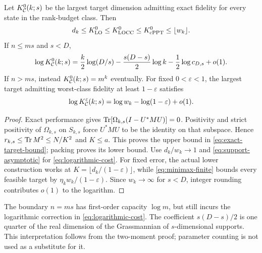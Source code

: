 \begin{corollary}\label{cor:targets}
Let $K_{\mathcal C}^0(k;s)$ be the largest target dimension admitting exact fidelity for every state in the rank-budget class. Then
\begin{equation}\label{eq:exact-target-bound}
 d_k\le K_{\mathrm{LO}}^0\le K_{\mathrm{LOCC}}^0\le K_{\mathrm{cPPT}}^0\le\lfloor w_k\rfloor.
\end{equation}
If $n\le ms$ and $s<D$,
\begin{equation}\label{eq:logarithmic-cost}
 \log K_{\mathcal C}^0(k;s)
 =\frac k2\log(D/s)-\frac{s(D-s)}2\log k-\frac12\log c_{D,s}+o(1).
\end{equation}
If $n>ms$, instead $K_{\mathcal C}^0(k;s)=m^k$ eventually. For fixed $0<\varepsilon<1$, the largest target admitting worst-class fidelity at least $1-\varepsilon$ satisfies
\begin{equation}\label{eq:fixed-error-minimax}
 \log K_{\mathcal C}^{\varepsilon}(k;s)
 =\log w_k-\log(1-\varepsilon)+o(1).
\end{equation}
\end{corollary}
\begin{proof}
Exact performance gives $\operatorname{Tr}[\Omega_{k,s}(I-U^*MU)]=0$. Positivity and strict positivity of $\Omega_{k,s}$ on $S_{k,s}$ force $U^*MU$ to be the identity on that subspace. Hence $r_{k,s}\le\operatorname{Tr} M^2\le N/K^2$ and $K\le a$. This proves the upper bound in \eqref{eq:exact-target-bound}; packing proves its lower bound. Use $d_k/w_k\to1$ and \eqref{eq:support-asymptotic} for \eqref{eq:logarithmic-cost}. For fixed error, the actual lower construction works at $K=\lfloor d_k/(1-\varepsilon)\rfloor$, while \eqref{eq:minimax-finite} bounds every feasible target by $\eta_kw_k/(1-\varepsilon)$. Since $w_k\to\infty$ for $s<D$, integer rounding contributes $o(1)$ to the logarithm.
\end{proof}

The boundary $n=ms$ has first-order capacity $\log m$, but still incurs the logarithmic correction in \eqref{eq:logarithmic-cost}. The coefficient $s(D-s)/2$ is one quarter of the real dimension of the Grassmannian of $s$-dimensional supports. This interpretation follows from the two-moment proof; parameter counting is not used as a substitute for it.

